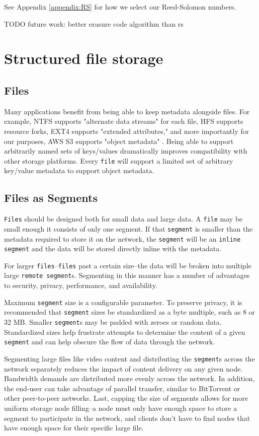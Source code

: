 \documentclass[11pt,fleqn,openany]{book}
\newcommand{\x}[1]{{\tt #1}} \newcommand{\code}[1]{{\tt #1}}
\newcommand{\todo}[1]{{\color{red} TODO #1 }}
\begin{document}
See Appendix \ref{appendix:RS} for how we select our Reed-Solomon numbers.

\todo{future work: better erasure code algorithm than rs}

\section{Structured file storage}

\subsection{Files}

Many applications benefit from being able to keep metadata alongside files. For
example, NTFS supports "alternate data streams" for each file, HFS supports
resource forks, EXT4 supports "extended attributes," and more importantly for
our purposes, AWS S3 supports "object metadata" \cite{s3-object-meta}. Being
able to support arbitrarily named sets of keys/values dramatically improves
compatibility with other storage platforms. Every \x{file} will support a
limited set of arbitrary key/value metadata to support object metadata.

\subsection{Files as Segments}

\x{Files} should be designed both for small data and large data.
A \x{file} may be small enough it consists of only one segment.
If that \x{segment} is smaller than the metadata required to store it on the
network, the \x{segment} will be an \x{inline segment} and the data will be
stored directly inline with the metadata.

For larger \x{files}--\x{files} past a certain size--the data will be broken
into multiple large \x{remote segment}s. Segmenting in this manner has a
number of advantages to security, privacy, performance, and availability.

Maximum \x{segment} size is a configurable parameter. To preserve privacy, it is
recommended that \x{segment} sizes be standardized as a byte multiple, such as 8
or 32 MB. Smaller \x{segment}s may be padded with zeroes or random data.
Standardized sizes help frustrate attempts to determine the content of a given
\x{segment} and can help obscure the flow of data through the network.

Segmenting large files like video content and distributing the \x{segment}s
across the network separately reduces the impact of content delivery on any
given node.
Bandwidth demands are distributed more evenly across the network.
In addition, the end-user can take advantage of parallel transfer, similar to
BitTorrent or other peer-to-peer networks. Last, capping the size of segments
allows for more uniform storage node filling--a node must only have enough
space to store a segment to participate in the network, and clients don't have
to find nodes that have enough space for their specific large file.
\end{document}

